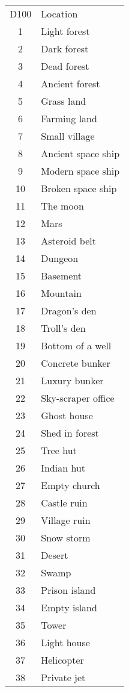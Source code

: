 \documentclass[11pt,a4paper,twocolumn]{article}
\begin{document}
\begin{tabular}{cl}
    \rowcolor{gray!50}
    D100 & Location\\
    1 & Light forest\\
    2 & Dark forest\\
    3 & Dead forest\\
    4 & Ancient forest\\
    5 & Grass land\\
    6 & Farming land\\
    7 & Small village\\
    8 & Ancient space ship\\
    9 & Modern space ship\\
    10 & Broken space ship\\
    11 & The moon\\
    12 & Mars\\
    13 & Asteroid belt\\
    14 & Dungeon\\
    15 & Basement\\
    16 & Mountain\\
    17 & Dragon's den\\
    18 & Troll's den\\
    19 & Bottom of a well\\
    20 & Concrete bunker\\
    21 & Luxury bunker\\
    22 & Sky-scraper office\\
    23 & Ghost house\\
    24 & Shed in forest\\
    25 & Tree hut\\
    26 & Indian hut\\
    27 & Empty church\\
    28 & Castle ruin\\
    29 & Village ruin\\
    30 & Snow storm\\
    31 & Desert\\
    32 & Swamp\\
    33 & Prison island\\
    34 & Empty island\\
    35 & Tower\\
    36 & Light house\\
    37 & Helicopter\\
    38 & Private jet\\
\end{tabular}
\end{document}
